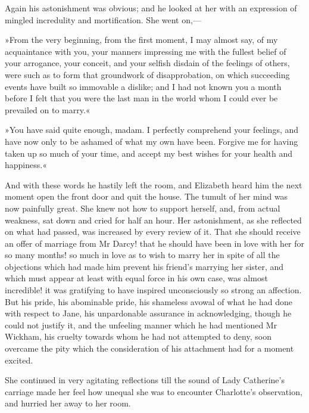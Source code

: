 Again his astonishment was obvious; and he looked at her with an expression of mingled incredulity and mortification. She went on,—

»From the very beginning, from the first moment, I may almost say, of my acquaintance with you, your manners impressing me with the fullest belief of your arrogance, your conceit, and your selfish disdain of the feelings of others, were such as to form that groundwork of disapprobation, on which succeeding events have built so immovable a dislike; and I had not known you a month before I felt that you were the last man in the world whom I could ever be prevailed on to marry.«

»You have said quite enough, madam. I perfectly comprehend your feelings, and have now only to be ashamed of what my own have been. Forgive me for having taken up so much of your time, and accept my best wishes for your health and happiness.«

And with these words he hastily left the room, and Elizabeth heard him the next moment open the front door and quit the house. The tumult of her mind was now painfully great. She knew not how to support herself, and, from actual weakness, sat down and cried for half an hour. Her astonishment, as she reflected on what had passed, was increased by every review of it. That she should receive an offer of marriage from Mr Darcy! that he should have been in love with her for so many months! so much in love as to wish to marry her in spite of all the objections which had made him prevent his friend's marrying her sister, and which must appear at least with equal force in his own case, was almost incredible! it was gratifying to have inspired unconsciously so strong an affection. But his pride, his abominable pride, his shameless avowal of what he had done with respect to Jane, his unpardonable assurance in acknowledging, though he could not justify it, and the unfeeling manner which he had mentioned Mr Wickham, his cruelty towards whom he had not attempted to deny, soon overcame the pity which the consideration of his attachment had for a moment excited.

She continued in very agitating reflections till the sound of Lady Catherine's carriage made her feel how unequal she was to encounter Charlotte's observation, and hurried her away to her room.